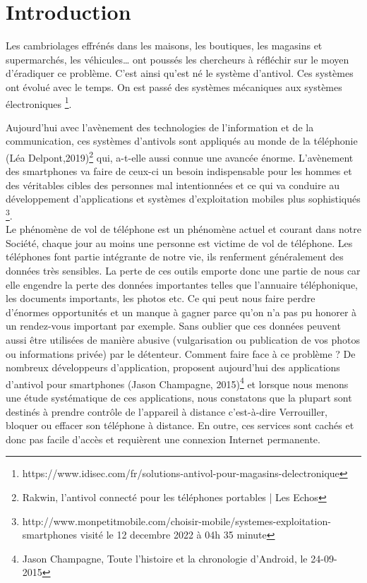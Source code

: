 \documentclass[a4paper, 12pt]{article}
\begin{document}
\section{Introduction}
\quad Les cambriolages effrénés dans les maisons, les boutiques, les magasins et supermarchés, les véhicules… ont poussés les chercheurs à réfléchir sur le moyen d’éradiquer ce problème. C’est ainsi qu’est né le système d'antivol. Ces systèmes ont évolué avec le temps. On est passé des systèmes mécaniques aux systèmes électroniques \footnote{https://www.idisec.com/fr/solutions-antivol-pour-magasins-delectronique }.

\quad Aujourd’hui avec l’avènement des technologies de l’information et de la communication, ces systèmes d’antivols sont appliqués au monde de la téléphonie (Léa Delpont,2019)\footnote{Rakwin, l'antivol connecté pour les téléphones portables | Les Echos } qui, a-t-elle aussi connue une avancée énorme. L’avènement des smartphones va faire de ceux-ci un besoin indispensable pour les hommes et des véritables cibles des personnes mal intentionnées et ce qui va conduire au développement d’applications et systèmes d’exploitation mobiles plus sophistiqués \footnote{http://www.monpetitmobile.com/choisir-mobile/systemes-exploitation-smartphones visité le 12 decembre 2022 à 04h 35 minute
}. \\

\quad Le phénomène de vol de téléphone est un phénomène actuel et courant dans notre Société, chaque jour au moins une personne est victime de vol de téléphone. Les téléphones font partie intégrante de notre vie, ils renferment généralement des données très sensibles. La perte de ces outils emporte donc une partie de nous car elle engendre la perte des données importantes telles que l’annuaire téléphonique, les documents importants, les photos etc. 
Ce qui peut nous faire perdre d’énormes opportunités et un manque à gagner parce qu’on n’a pas pu honorer à un rendez-vous important par exemple. Sans oublier que ces données peuvent aussi être utilisées de manière abusive (vulgarisation ou publication de vos photos ou informations privée) par le détenteur. Comment faire face à ce problème ? De nombreux développeurs d’application, proposent aujourd’hui des applications d’antivol pour smartphones (Jason Champagne, 2015)\footnote{Jason Champagne, Toute l’histoire et la chronologie d’Android, le 24-09-2015} et lorsque nous menons une étude systématique de ces applications, nous constatons que la plupart sont destinés à prendre contrôle de l’appareil à distance c’est-à-dire Verrouiller, bloquer ou effacer son téléphone à distance. En outre, ces services sont cachés et donc pas facile d’accès et requièrent une connexion Internet permanente. 
\end{document}
